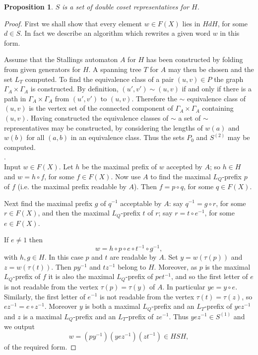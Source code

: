 \documentclass[a4paper,12pt]{article}
\newcommand{\G}{\Gamma }
\renewcommand{\t}{\tau }
\newtheorem{proposition}[theorem]{Proposition}
\numberwithin{equation}{section}
\numberwithin{figure}{section}
\begin{document}
\begin{proposition}\label{prop:dcreps}
$S$ is a set of double coset representatives for $H$.
\end{proposition}
\begin{proof}
First we shall show that every element $w\in F(X)$ lies in $HdH$,
for some $d\in S$. In fact we describe an algorithm which
rewrites a given word $w$ in this form.

Assume that the Stallings automaton $A$ for $H$ has been constructed by folding from
given generators for $H$. A spanning tree $T$
for $A$ may then be chosen and the
set $L_T$ computed. 
To find the equivalence class of a pair $(u,v)\in P$ the 
graph $\G_A\times \G_A$ is constructed. By definition, $(u',v')\sim 
(u,v)$ if and only if there is a path in $\G_A\times \G_A$ from $(u',v')$
to $(u,v)$. Therefore the $\sim$ equivalence class of $(u,v)$ is the
vertex set of the connected component of $\G_A\times \G_A$ containing
$(u,v)$.   
Having constructed the equivalence classes of $\sim$
 a set of $\sim$ representatives may be constructed, by considering the
lengths of $w(a)$ and $w(b)$ for all $(a,b)$ in an equivalence class. Thus the
sets $P_0$ and $S^{(2)}$ may be computed.   \\

.\\
Input $w\in F(X)$.
Let $h$ be the maximal prefix of $w$ accepted by $A$; so $h\in H$ and
$w=h\circ f$, for some $f\in F(X)$. Now use $A$ to find the maximal 
$L_Q$-prefix $p$
of $f$ (i.e. the maximal prefix readable by $A$). Then
  $f= p\circ q$, for some $q\in F(X)$.

Next find the maximal prefix $g$ of $q^{-1}$ acceptable by $A$: say
$q^{-1}=g\circ r$, for some $r\in F(X)$, and then the maximal $L_Q$-prefix
$t$ of $r$; say $r=t\circ e^{-1}$, for some $e\in F(X)$.

If $e\neq 1$ then
\[w=h\circ p \circ e\circ t^{-1}\circ g^{-1},\]
with $h,g\in H$. In this case $p$ and $t$ are readable by $A$. Set $y=w(\t(p))$
and $z=w(\t(t))$. Then $py^{-1}$ and $tz^{-1}$ belong to $H$. Moreover, as $p$
is the maximal $L_Q$-prefix of $f$ it is also the maximal
$L_Q$-prefix of $pet^{-1}$,  and so
  the
first letter of $e$ is not readable from the vertex $\t(p)=\t(y)$ of $A$.
In particular
$ye=y\circ e$. Similarly, the first letter of $e^{-1}$ is not readable from
the vertex $\t(t)=\t(z)$, so $ez^{-1}=e\circ z^{-1}$. Moreover $y$ is both 
a
maximal $L_Q$-prefix  and an $L_T$-prefix of $yez^{-1}$ and $z$ is a 
maximal $L_Q$-prefix  and an $L_T$-prefix of $ze^{-1}$.
Thus $yez^{-1}\in S^{(1)}$ and we output
\[w=(py^{-1}) (yez^{-1})(zt^{-1})\in HSH,\]
of the required form.


\end{proof}
\end{document}

